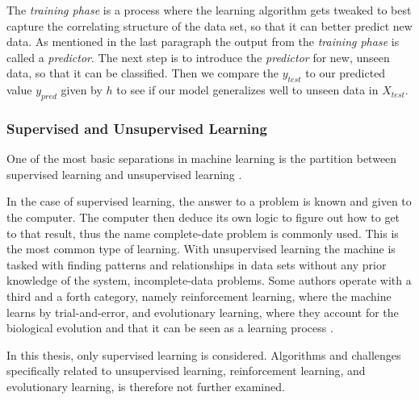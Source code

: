 	The \textit{training phase} is a process where the learning algorithm gets tweaked to best capture the correlating structure of the data set, so that it can better predict new data. As mentioned in the last paragraph the output from the \textit{training phase} is called a \textit{predictor}. The next step is to introduce the \textit{predictor} for new, unseen data, so that it can be classified. Then we compare the $y_{test}$ to our predicted value $y_{pred}$ given by $h$ to see if our model generalizes well to unseen data in $X_{test}$.
	
	\subsubsection{Supervised and Unsupervised Learning }
	One of the most basic separations in machine learning is the partition between supervised learning and unsupervised learning \cite{gentle2012handbook}.
	
	In the case of supervised learning, the answer to a problem is known and given to the computer. The computer then deduce its own logic to figure out how to get to that result, thus the name complete-date problem is commonly used. This is the most common type of learning. With unsupervised learning the machine is tasked with finding patterns and relationships in data sets without any prior knowledge of the system, incomplete-data problems. Some authors operate with a third and a forth category, namely reinforcement learning, where the machine learns by trial-and-error, and evolutionary learning, where they account for the biological evolution and that it can be seen as a learning process \cite{marsland2014machine}.
		
	In this thesis, only supervised learning is considered. Algorithms and challenges specifically related to unsupervised learning, reinforcement learning, and evolutionary learning, is therefore not further examined.

